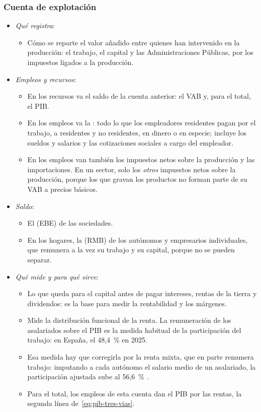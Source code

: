 \documentclass[11pt]{article}
\begin{document}
\subsubsection{Cuenta de explotación}\label{sec:explotacion}

\begin{itemize}
\item \emph{Qué registra}:
  \begin{itemize}
  \item Cómo se reparte el valor añadido entre quienes han intervenido en la producción: el trabajo, el capital y las Administraciones Públicas, por los impuestos ligados a la producción.
  \end{itemize}
\item \emph{Empleos y recursos}:
  \begin{itemize}
  \item En los recursos va el saldo de la cuenta anterior: el VAB y, para el total, el PIB.
  \item En los empleos va la : todo lo que los empleadores residentes pagan por el trabajo, a residentes y no residentes, en dinero o en especie; incluye los sueldos y salarios y las cotizaciones sociales a cargo del empleador.
  \item En los empleos van también los impuestos netos sobre la producción y las importaciones. En un sector, solo los \emph{otros} impuestos netos sobre la producción, porque los que gravan los productos no forman parte de su VAB a precios básicos.
  \end{itemize}
\item \emph{Saldo}:
  \begin{itemize}
  \item El  (EBE) de las sociedades.
  \item En los hogares, la  (RMB) de los autónomos y empresarios individuales, que remunera a la vez su trabajo y su capital, porque no se pueden separar.
  \end{itemize}
\item \emph{Qué mide y para qué sirve}:
  \begin{itemize}
  \item Lo que queda para el capital antes de pagar intereses, rentas de la tierra y dividendos: es la base para medir la rentabilidad y los márgenes.
  \item Mide la distribución funcional de la renta. La remuneración de los asalariados sobre el PIB es la medida habitual de la participación del trabajo: en España, el 48,4~\% en 2025\nocite{Eurostat2026nama10gdp}.
  \item Esa medida hay que corregirla por la renta mixta, que en parte remunera trabajo: imputando a cada autónomo el salario medio de un asalariado, la participación ajustada sube al 56,6~\%\nocite{CE2026AMECO}  .
  \item Para el total, los empleos de esta cuenta dan el PIB por las rentas, la segunda línea de~\eqref{eq:pib-tres-vias}.
  \end{itemize}
\end{itemize}
\end{document}
